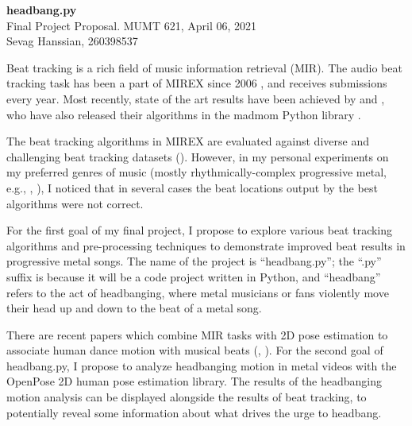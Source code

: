 \documentclass[letter,12pt]{report}
\begin{document}
\Large{\textbf{headbang.py}}\\
\large{Final Project Proposal. MUMT 621, April 06, 2021}\\
\large{Sevag Hanssian, 260398537}

\hrulefill

\vspace{2em}

Beat tracking is a rich field of music information retrieval (MIR). The audio beat tracking task has been a part of MIREX since 2006 \cite{mirex06}, and receives submissions every year. Most recently, state of the art results have been achieved by \cite{bock1} and \cite{bock2}, who have also released their algorithms in the madmom Python library \cite{madmom}.

\vspace{1em}

\qquad The beat tracking algorithms in MIREX are evaluated against diverse and challenging beat tracking datasets (\cite{beatmeta}). However, in my personal experiments on my preferred genres of music (mostly rhythmically-complex progressive metal, e.g., \cite{meshuggah}, \cite{periphery}), I noticed that in several cases the beat locations output by the best algorithms were not correct.

\vspace{1em}

\qquad For the first goal of my final project, I propose to explore various beat tracking algorithms and pre-processing techniques to demonstrate improved beat results in progressive metal songs. The name of the project is ``headbang.py''; the ``.py'' suffix is because it will be a code project written in Python, and ``headbang'' refers to the act of headbanging, where metal musicians or fans violently move their head up and down to the beat of a metal song.

\vspace{1em}

\qquad There are recent papers which combine MIR tasks with 2D pose estimation to associate human dance motion with musical beats (\cite{pose1}, \cite{pose2}). For the second goal of headbang.py, I propose to analyze headbanging motion in metal videos with the OpenPose 2D human pose estimation library. The results of the headbanging motion analysis can be displayed alongside the results of beat tracking, to potentially reveal some information about what drives the urge to headbang.

\vspace{1em}
\end{document}
